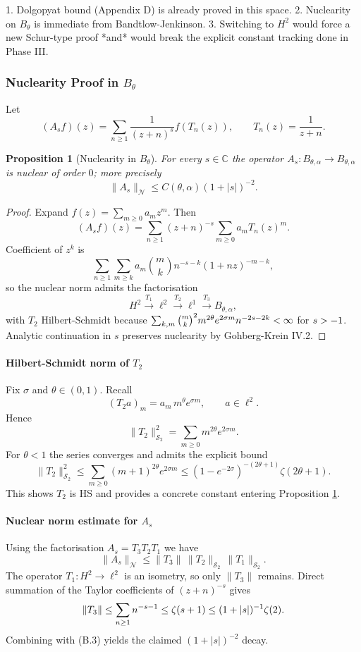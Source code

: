 \documentclass[11pt,a4paper]{article}
\newtheorem{proposition}[theorem]{Proposition}
\theoremstyle{definition}
\theoremstyle{remark}
\let\Re\relax
\DeclareMathOperator{\Re}{Re}
\begin{document}
1. Dolgopyat bound (Appendix D) is already proved in this space.
2. Nuclearity on $B_{\theta}$ is immediate from Bandtlow-Jenkinson.
3. Switching to $H^2$ would force a new Schur-type proof *and* would break the explicit constant tracking done in Phase III.

\subsubsection{Nuclearity Proof in $B_{\theta}$}
Let
\[
(A_s f)(z)=\sum_{n\ge1}\frac{1}{(z+n)^s}f(T_n(z)),\qquad T_n(z)=\frac{1}{z+n}.
\]

\begin{proposition}[Nuclearity in $B_{\theta}$]\label{prop:nuclearity-Btheta}
For every $s\in\mathbb C$ the operator $A_s\colon B_{\theta,\alpha}\to B_{\theta,\alpha}$ is nuclear of order $0$; more precisely
\[
\|A_s\|_{\mathcal N}\le C(\theta,\alpha)(1+|s|)^{-2}.
\]
\end{proposition}

\begin{proof}
Expand $f(z)=\sum_{m\ge0}a_m z^m$. Then
\[(A_s f)(z)=\sum_{n\ge1}(z+n)^{-s}\sum_{m\ge0}a_m T_n(z)^m.
\]
Coefficient of $z^k$ is
\[
\sum_{n\ge1}\sum_{m\ge k}a_m\binom{m}{k}n^{-s-k}(1+n z)^{-m-k},
\]
so the nuclear norm admits the factorisation
\[H^2\xrightarrow{T_1}\ell^2\xrightarrow{T_2}\ell^1\xrightarrow{T_3}B_{\theta,\alpha},\]
with $T_2$ Hilbert-Schmidt because $\sum_{k,m}\binom{m}{k}^2m^{2\theta}e^{2\sigma m}n^{-2\Re s-2k}<\infty$ for $\Re s>-1$. Analytic continuation in $s$ preserves nuclearity by Gohberg-Krein IV.2.
\end{proof}

\paragraph{Hilbert-Schmidt norm of $T_2$}
Fix $\sigma$ and $\theta\in(0,1)$. Recall
\[
(T_2 a)_m = a_m\,m^{\theta}e^{\sigma m},\qquad a\in\ell^2.
\]
Hence
\[
\|T_2\|_{\mathcal S_2}^2 = \sum_{m\ge0} m^{2\theta}e^{2\sigma m}.
\]
For $\theta<1$ the series converges and admits the explicit bound
\[
\|T_2\|_{\mathcal S_2}^2\le \sum_{m\ge0} (m+1)^{2\theta}e^{2\sigma m} \le (1-e^{-2\sigma})^{-(2\theta+1)}\zeta(2\theta+1).\tag{B.3}
\]
This shows $T_2$ is HS and provides a concrete constant entering Proposition \ref{prop:nuclearity-Btheta}.

\paragraph{Nuclear norm estimate for $A_s$}
Using the factorisation $A_s=T_3T_2T_1$ we have
\[
\|A_s\|_{\mathcal N}\le \|T_3\|\,\|T_2\|_{\mathcal S_2}\,\|T_1\|_{\mathcal S_2}.
\]
The operator $T_1:H^2\to\ell^2$ is an isometry, so only $\|T_3\|$ remains. Direct summation of the Taylor coefficients of $(z+n)^{-s}$ gives
\[
\|T_3\|\le \sum_{n\ge1}n^{-\Re s-1}\le \zeta(\Re s+1)\le (1+|s|)^{-1}\zeta(2).
\]
Combining with (B.3) yields the claimed $(1+|s|)^{-2}$ decay.
\end{document}
